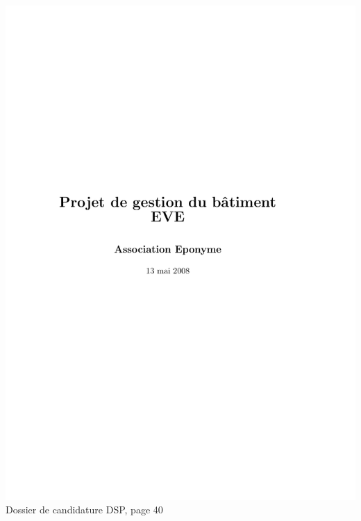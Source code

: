 \includegraphics[scale=0.85,trim=20mm 20mm 20mm 20mm,clip,page=40]{annexes/candidature_dsp.pdf} \\
Dossier de candidature DSP, page 40
\newpage
